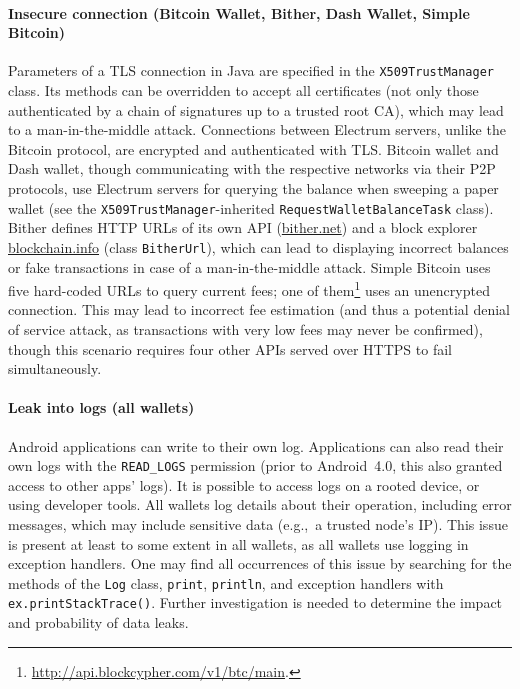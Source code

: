 \paragraph{Insecure connection (Bitcoin Wallet, Bither, Dash Wallet, Simple Bitcoin)}
Parameters of a TLS connection in Java are specified in the \texttt{X509TrustManager} class.
Its methods can be overridden to accept all certificates (not only those authenticated by a chain of signatures up to a trusted root CA), which may lead to a man-in-the-middle attack.
Connections between Electrum servers, unlike the Bitcoin protocol, are encrypted and authenticated with TLS.
Bitcoin wallet and Dash wallet, though communicating with the respective networks via their P2P protocols, use Electrum servers for querying the balance when sweeping a paper wallet (see the \texttt{X509TrustManager}-inherited \texttt{RequestWalletBalanceTask} class).
Bither defines HTTP URLs of its own API (\url{bither.net}) and a block explorer \url{blockchain.info} (class \texttt{BitherUrl}), which can lead to displaying incorrect balances or fake transactions in case of a man-in-the-middle attack.
Simple Bitcoin uses five hard-coded URLs to query current fees; one of them\footnote{\url{http://api.blockcypher.com/v1/btc/main}.} uses an unencrypted connection.
This may lead to incorrect fee estimation (and thus a potential denial of service attack, as transactions with very low fees may never be confirmed), though this scenario requires four other APIs served over HTTPS to fail simultaneously.

\paragraph{Leak into logs (all wallets)}
Android applications can write to their own log.
Applications can also read their own logs with the \texttt{READ\_LOGS} permission (prior to Android~4.0, this also granted access to other apps' logs).
It is possible to access logs on a rooted device, or using developer tools.
All wallets log details about their operation, including error messages, which may include sensitive data (e.g.,~a trusted node's IP).
This issue is present at least to some extent in all wallets, as all wallets use logging in exception handlers.
One may find all occurrences of this issue by searching for the methods of the \texttt{Log} class, \texttt{print}, \texttt{println}, and exception handlers with \texttt{ex.printStackTrace()}.
Further investigation is needed to determine the impact and probability of data leaks.


